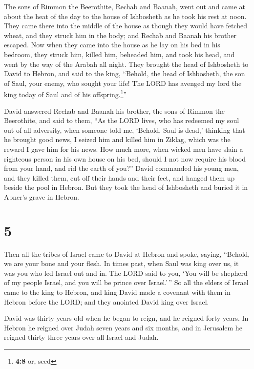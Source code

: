 The sons of Rimmon the Beerothite, Rechab and Baanah,
went out and came at about the heat of the day to the house of
Ishbosheth as he took his rest at noon.  They came there
into the middle of the house as though they would have fetched wheat,
and they struck him in the body; and Rechab and Baanah his brother
escaped.  Now when they came into the house as he lay on
his bed in his bedroom, they struck him, killed him, beheaded him, and
took his head, and went by the way of the Arabah all night.
 They brought the head of Ishbosheth to David to Hebron,
and said to the king, ``Behold, the head of Ishbosheth, the son of Saul,
your enemy, who sought your life! The LORD has avenged my lord the king
today of Saul and of his offspring.\footnote{\textbf{4:8} or, seed}''

 David answered Rechab and Baanah his brother, the sons of
Rimmon the Beerothite, and said to them, ``As the LORD lives, who has
redeemed my soul out of all adversity,  when someone told
me, `Behold, Saul is dead,' thinking that he brought good news, I seized
him and killed him in Ziklag, which was the reward I gave him for his
news.  How much more, when wicked men have slain a
righteous person in his own house on his bed, should I not now require
his blood from your hand, and rid the earth of you?'' 
David commanded his young men, and they killed them, cut off their hands
and their feet, and hanged them up beside the pool in Hebron. But they
took the head of Ishbosheth and buried it in Abner's grave in Hebron.

\hypertarget{section-4}{%
\section{5}\label{section-4}}

 Then all the tribes of Israel came to David at Hebron and
spoke, saying, ``Behold, we are your bone and your flesh. 
In times past, when Saul was king over us, it was you who led Israel out
and in. The LORD said to you, `You will be shepherd of my people Israel,
and you will be prince over Israel.'\,''  So all the
elders of Israel came to the king to Hebron, and king David made a
covenant with them in Hebron before the LORD; and they anointed David
king over Israel.

 David was thirty years old when he began to reign, and he
reigned forty years.  In Hebron he reigned over Judah
seven years and six months, and in Jerusalem he reigned thirty-three
years over all Israel and Judah.

